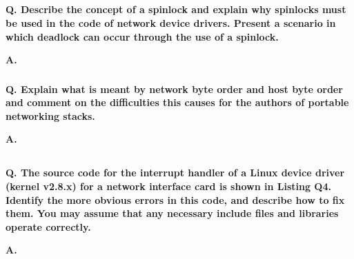\subsection{}

\subsubsection{}

\textbf{Q. Describe the concept of a spinlock and explain why spinlocks must be
used in the code of network device drivers. Present a scenario in which deadlock can
occur through the use of a spinlock.}

\textbf{A.}

\subsubsection{}

\textbf{Q. Explain what is meant by network byte order and host byte order and comment on
the difficulties this causes for the authors of portable networking stacks.}

\textbf{A.}

\subsection{}

\textbf{Q. The source code for the interrupt handler of a Linux device driver (kernel
v2.8.x) for a network interface card is shown in Listing Q4. Identify the more
obvious errors in this code, and describe how to fix them. You may assume that
any necessary include files and libraries operate correctly.}

\textbf{A.}

